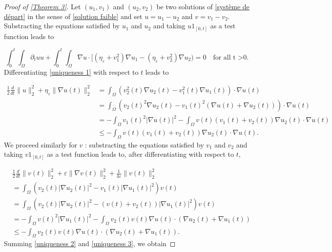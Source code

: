 \documentclass[reqno,12pt,twoside]{amsart}
\numberwithin{equation}{section} \numberwithin{theorem}{section}
\numberwithin{proposition}{section} \numberwithin{lemma}{section}
\numberwithin{corollary}{section}
\numberwithin{definition}{section} \numberwithin{remark}{section}
\begin{document}
\begin{proof}[Proof of \autoref{Theorem 3}]
Let $(u_1, v_1)$ and $(u_2, v_2)$ be two solutions of \eqref{système de départ} in the sense of \autoref{solution faible} and set $u = u_1 -u_2$ and $v=v_1 - v_2$. 
Substracting the equations satisfied by $u_1$ and $u_2$ and taking $u1_[0,t]$ as a test function leads to 

\begin{equation}\label{uniqueness 1}
\int_0^t \int_\Omega \partial_t u u + \int_0^t \int_\Omega \nabla u\cdot [(\eta_\varepsilon + v_1^2) \nabla u_1 - (\eta_\varepsilon + v_2^2) \nabla u_2) = 0 \quad \text{for all t >0}.
\end{equation}
Differentiating \eqref{uniqueness 1} with respect to $t$ leads to

\begin{align}\label{uniqueness 2}
\frac{1}{2}\frac{d}{dt} \|u\|_2^2 + \eta_\varepsilon  \|\nabla u(t)\|_2^2 &= \int_{\Omega} (v_2^2(t)\nabla u_2(t) - v_1^2(t) \nabla u_1(t))\cdot \nabla u (t) \nonumber\\
&= \int_\Omega (v_2(t)^2 \nabla u_2(t) - v_1(t)^2 (\nabla u(t) + \nabla u_2(t)))\cdot \nabla u(t) \nonumber\\
&= -\int_\Omega v_1(t)^2 |\nabla u(t)|^2 - \int_\Omega v(t) (v_1(t) +v_2(t))\nabla u_2(t)\cdot \nabla u(t) \nonumber\\
&\leqslant - \int_\Omega v(t) (v_1(t) +v_2(t))\nabla u_2(t)\cdot \nabla u(t).
\end{align}
%
We proceed similarly for $v$ : substracting the equations satisfied by $v_1$ and $v_2$ and taking $v 1_[0,t]$ as a test function leads to, after differentiating with respect to $t$,  

\begin{align}\label{uniqueness 3}
&\frac{1}{2}\frac{d}{dt} \|v(t)\|_2^2 + \varepsilon \|\nabla v(t)\|_2^2 + \frac{1}{4\varepsilon} \|v(t)\|_2^2\\
 &= \int_\Omega (v_2(t)|\nabla u_2(t)|^2 - v_1(t)|\nabla u_1(t)|^2) v(t) \nonumber\\
 &= \int_\Omega (v_2(t)|\nabla u_2(t)|^2 - (v(t)+v_2(t))|\nabla u_1(t)|^2) v(t)\nonumber \\
 &= -\int_\Omega v(t)^2 |\nabla u_1(t)|^2 - \int_\Omega v_2(t) v(t) \nabla u(t)\cdot (\nabla u_2(t) + \nabla u_1(t)) \nonumber\\
 & \leqslant - \int_\Omega v_2(t) v(t) \nabla u(t)\cdot (\nabla u_2(t) + \nabla u_1(t)).
\end{align}
%
Summing \eqref{uniqueness 2} and \eqref{uniqueness 3}, we obtain 


\end{proof}
\end{document}
